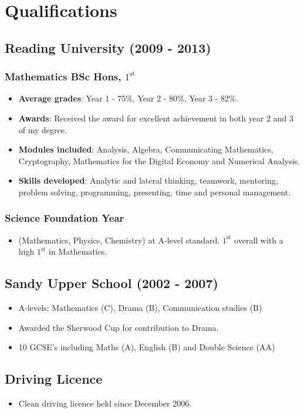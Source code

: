 \documentclass[11pt]{article}
\begin{document}
\section*{Qualifications}
\subsection*{Reading University (2009 - 2013)}
\subsubsection*{Mathematics BSc Hons, \(1^{\text{st}}\)}
\begin{itemize}
\item \textbf{Average grades}: Year 1 - 75\%, Year 2 - 80\%, Year 3 - 82\%.
\item \textbf{Awards}: Received the award for excellent achievement in both year 2 and 3 of my degree.
\item \textbf{Modules included}: Analysis, Algebra, Communicating Mathematics, Cryptography, Mathematics for the Digital Economy and Numerical Analysis.
\item \textbf{Skills developed}: Analytic and lateral thinking, teamwork, mentoring, problem solving, programming, presenting, time and personal management.
\end{itemize}
\subsubsection*{Science Foundation Year}
\begin{itemize}
\item (Mathematics, Physics, Chemistry) at A-level standard. \(1^{\text{st}}\) overall with a high \(1^{\text{st}}\) in Mathematics.
\end{itemize}
\subsection*{Sandy Upper School (2002 - 2007)}
\begin{itemize}
\item A-levels: Mathematics (C), Drama (B), Communication studies (B)
\item Awarded the Sherwood Cup for contribution to Drama.
\item 10 GCSE's including Maths (A), English (B) and Double Science (AA) 
\end{itemize}
\subsection*{Driving Licence}
\begin{itemize}
\item Clean driving licence held since December 2006.
\end{itemize}
\end{document}
